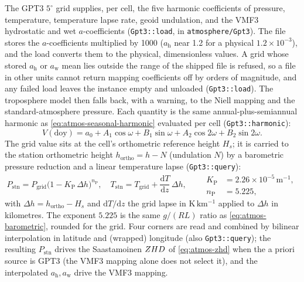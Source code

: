 \documentclass[main.tex]{subfiles}
\begin{document}
The GPT3 $5^\circ$ grid \cite{landskron2018vmf3} supplies, per cell, the
five harmonic coefficients of pressure, temperature, temperature lapse
rate, geoid undulation, and the VMF3 hydrostatic and wet $a$-coefficients
(\texttt{Gpt3::load}, in \texttt{atmosphere/Gpt3}).  The file stores the
$a$-coefficients multiplied by 1000 ($a_{\mathrm h}$ near 1.2 for a physical
$1.2\times10^{-3}$), and the load converts them to the physical,
dimensionless values.  A grid whose stored $a_{\mathrm h}$ or $a_{\mathrm w}$
mean lies outside the range of the shipped file is refused, so a file in
other units cannot return mapping coefficients off by orders of
magnitude, and any failed load leaves the instance empty and unloaded
(\texttt{Gpt3::load}).  The troposphere model then falls back, with a
warning, to the Niell mapping and the standard-atmosphere pressure.  Each quantity is the
same annual-plus-semiannual harmonic as \eqref{eq:atmos-seasonal-harmonic}
evaluated per cell (\texttt{Gpt3::harmonic}):
\begin{equation}
V(\mathrm{doy}) = a_0 + A_1\cos\omega + B_1\sin\omega
                       + A_2\cos 2\omega + B_2\sin 2\omega .
\label{eq:atmos-gpt3-harmonic}
\end{equation}
The grid value sits at the cell's orthometric reference height $H_s$; it is
carried to the station orthometric height $h_{\mathrm{ortho}} = h - N$
(undulation $N$) by a barometric pressure reduction and a linear
temperature lapse (\texttt{Gpt3::query}):
\begin{equation}
P_{\mathrm{stn}} = P_{\mathrm{grid}}
   \bigl(1 - K_{\mathrm P}\,\Delta h\bigr)^{n_{\mathrm P}},
\quad
T_{\mathrm{stn}} = T_{\mathrm{grid}} + \frac{\mathrm dT}{\mathrm dz}\,\Delta h,
\qquad
\begin{aligned}
K_{\mathrm P} &= 2.26\times10^{-5}\,\mathrm{m^{-1}},\\
n_{\mathrm P} &= 5.225,
\end{aligned}
\label{eq:atmos-gpt3-reduce}
\end{equation}
with $\Delta h = h_{\mathrm{ortho}} - H_s$ and $\mathrm dT/\mathrm dz$ the
grid lapse in $\mathrm{K\,km^{-1}}$ applied to $\Delta h$ in kilometres.
The exponent $5.225$ is the same $g/(RL)$ ratio as
\eqref{eq:atmos-barometric}, rounded for the grid.  Four corners are read
and combined by bilinear interpolation in latitude and (wrapped) longitude
(also \texttt{Gpt3::query}); the resulting $P_{\mathrm{stn}}$ drives
the Saastamoinen $ZHD$ of \eqref{eq:atmos-zhd} when the a priori source is
GPT3 (the VMF3 mapping alone does not select it), and the interpolated
$a_{\mathrm h},a_{\mathrm w}$ drive the VMF3 mapping.
\end{document}
